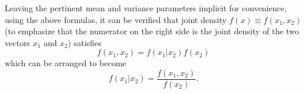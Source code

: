 Leaving the pertinent mean and variance parameters implicit for convenience, using the above formulas, it can be verified that joint density
$f(x) \equiv f(x_1, x_2)$ (to emphasize that the numerator on the right side is the joint density of the two vectors $x_1 $ and $x_2$)  satisfies
$$ f(x_1, x_2 ) = f(x_1 | x_2)   f(x_2)  $$  
which can be arranged to become 
$$ f(x_1 | x_2) = {\frac{f(x_1, x_2)}{f(x_2)} } .$$



\bye






\bye
